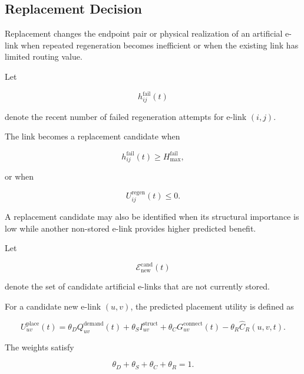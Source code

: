 \subsection{Replacement Decision}

Replacement changes the endpoint pair or physical realization of an artificial e-link when repeated regeneration becomes inefficient or when the existing link has limited routing value.

Let

\begin{equation}
    h_{ij}^{\mathrm{fail}}(t)
\end{equation}

denote the recent number of failed regeneration attempts for e-link $(i,j)$.

The link becomes a replacement candidate when

\begin{equation}
    h_{ij}^{\mathrm{fail}}(t)
    \geq
    H_{\max}^{\mathrm{fail}},
\end{equation}

or when

\begin{equation}
    U_{ij}^{\mathrm{regen}}(t)
    \leq
    0.
\end{equation}

A replacement candidate may also be identified when its structural importance is low while another non-stored e-link provides higher predicted benefit.

Let

\begin{equation}
    \mathcal{E}_{\mathrm{new}}^{\mathrm{cand}}(t)
\end{equation}

denote the set of candidate artificial e-links that are not currently stored.

For a candidate new e-link $(u,v)$, the predicted placement utility is defined as

\begin{equation}
    U_{uv}^{\mathrm{place}}(t)
    =
    \theta_D
    Q_{uv}^{\mathrm{demand}}(t)
    +
    \theta_S
    I_{uv}^{\mathrm{struct}}
    +
    \theta_C
    G_{uv}^{\mathrm{connect}}(t)
    -
    \theta_R
    \widehat{C}_{R}(u,v,t).
\end{equation}

The weights satisfy

\begin{equation}
    \theta_D
    +
    \theta_S
    +
    \theta_C
    +
    \theta_R
    =
    1.
\end{equation}

